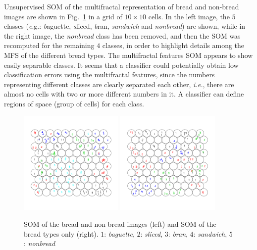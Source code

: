 Unsupervised SOM of the multifractal representation of bread and non-bread images are shown in Fig.~\ref{fig:somfractal} in a grid of $10\times10$ cells. In the left image, the $5$ classes ({\emph e.g.}: {\emph baguette}, {\emph sliced}, {\emph bran}, {\em sandwich} and {\em nonbread}) are shown, while in the right image, the {\em nonbread} class has been removed, and then the SOM was recomputed for the remaining $4$ classes, in order to highlight details among the MFS of the different bread types. The multifractal features SOM appears to show easily separable classes. It seems that a classifier could potentially obtain low classification errors using the multifractal features, since the numbers representing different classes are clearly separated each other, {\em i.e.}, there are almost no cells with two or more different numbers in it. A classifier can define regions of space (group of cells) for each class.
\begin{figure}
\begin{centering}
\includegraphics[width=0.45\textwidth]{../exps/som/sommultifractal}
\includegraphics[width=0.45\textwidth]{../exps/som/sombreadmultifractal}
\caption{SOM of the bread and non-bread images (left) and SOM of the bread types only (right). $1$: {\em baguette}, $2$: {\em sliced}, $3$: {\em bran}, $4$: {\em sandwich}, $5$: {\em nonbread} }
\label{fig:somfractal}
\end{centering}
\end{figure}

